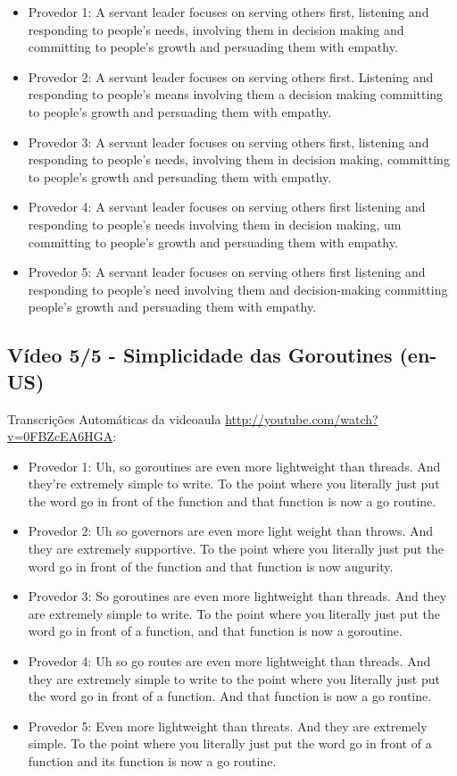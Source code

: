 \begin{itemize}
    \item Provedor 1: A servant leader focuses on serving others first, listening and responding to people's needs, involving them in decision making and committing to people's growth and persuading them with empathy.
    \item Provedor 2: A servant leader focuses on serving others first. Listening and responding to people's means involving them a decision making committing to people's growth and persuading them with empathy.
    \item Provedor 3: A servant leader focuses on serving others first, listening and responding to people's needs, involving them in decision making, committing to people's growth and persuading them with empathy.
    \item Provedor 4: A servant leader focuses on serving others first listening and responding to people's needs involving them in decision making, um committing to people's growth and persuading them with empathy.
    \item Provedor 5: A servant leader focuses on serving others first listening and responding to people's need involving them and decision-making committing people's growth and persuading them with empathy.
\end{itemize}

\subsection{Vídeo 5/5 - Simplicidade das Goroutines (en-US)}

\noindent
Transcrições Automáticas da videoaula \url{http://youtube.com/watch?v=0FBZcEA6HGA}:

\begin{itemize}
    \item Provedor 1: Uh, so goroutines are even more lightweight than threads. And they're extremely simple to write. To the point where you literally just put the word go in front of the function and that function is now a go routine.
    \item Provedor 2: Uh so governors are even more light weight than throws. And they are extremely supportive. To the point where you literally just put the word go in front of the function and that function is now augurity.
    \item Provedor 3: So goroutines are even more lightweight than threads. And they are extremely simple to write. To the point where you literally just put the word go in front of a function, and that function is now a goroutine.
    \item Provedor 4: Uh so go routes are even more lightweight than threads. And they are extremely simple to write to the point where you literally just put the word go in front of a function. And that function is now a go routine.
    \item Provedor 5: Even more lightweight than threats. And they are extremely simple. To the point where you literally just put the word go in front of a function and its function is now a go routine.
\end{itemize}

